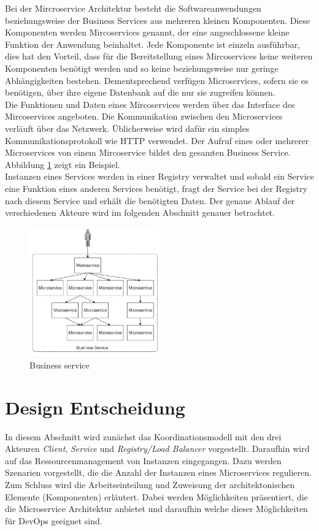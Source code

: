 Bei der Mircroservice Architektur besteht die Softwareanwendungen beziehungsweise der Business Services aus mehreren kleinen Komponenten. Diese Komponenten werden Mircoservices genannt, der eine angeschlossene kleine Funktion der Anwendung beinhaltet. Jede Komponente ist einzeln ausführbar, dies hat den Vorteil, dass für die Bereitstellung eines Mircoservices keine weiteren Komponenten benötigt werden und so keine beziehungsweise nur geringe Abhängigkeiten bestehen. Dementsprechend verfügen Microservices, sofern sie es benötigen, über ihre eigene Datenbank auf die nur sie zugreifen können. \\
Die Funktionen und Daten eines Mircoservices werden über das Interface des Mircoservices angeboten. Die Kommunikation zwischen den Microservices verläuft über das Netzwerk. Üblicherweise wird dafür ein simples Kommunikationsprotokoll wie HTTP verwendet. Der Aufruf eines oder mehrerer Microservices von einem Mircoservice bildet den gesamten Business Service. Abbildung \ref{aService} zeigt ein Beispiel. \\
Instanzen eines Services werden in einer Registry verwaltet und sobald ein Service eine Funktion eines anderen Services benötigt, fragt der Service bei der Registry nach diesem Service und erhält die benötigten Daten. Der genaue Ablauf der verschiedenen Akteure wird im folgenden Abschnitt genauer betrachtet.\\

\begin{figure}[htbp]
  \centering
  \includegraphics[width=0.5\textwidth]{pictures/businessService.png}
	\caption{Business service}
	\label{aService}
\end{figure}

\section{Design Entscheidung}
In diesem Abschnitt wird zunächst das Koordinationsmodell mit den drei Akteuren \textit{Client}, \textit{Service} und \textit{Registry/Load Balancer} vorgestellt. Daraufhin wird auf das Ressourcenmanagement von Instanzen eingegangen. Dazu werden Szenarien vorgestellt, die die Anzahl der Instanzen eines Microservices regulieren. Zum Schluss wird die Arbeitseinteilung und Zuweisung der architektonischen Elemente (Komponenten) erläutert. Dabei werden Möglichkeiten präsentiert, die die Microservice Architektur anbietet und daraufhin welche dieser Möglichkeiten für DevOps geeignet sind.

